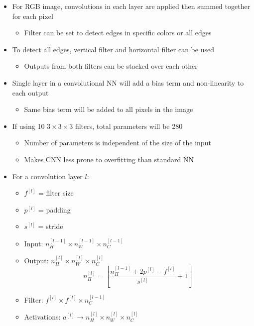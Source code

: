 \documentclass[12pt, letterpaper]{article}
\begin{document}
\begin{itemize}
\begin{figure}[ht]
        \end{figure}
        \item For RGB image, convolutions in each layer are applied then summed together for each pixel
        \begin{itemize}
            \item Filter can be set to detect edges in specific colors or all edges
        \end{itemize}
        \item To detect all edges, vertical filter and horizontal filter can be used
        \begin{itemize}
            \item Outputs from both filters can be stacked over each other
        \end{itemize}
        \item Single layer in a convolutional NN will add a bias term and non-linearity to each output
        \begin{itemize}
            \item Same bias term will be added to all pixels in the image
        \end{itemize}
        \item If using 10 $3\times 3\times 3$ filters, total parameters will be 280
        \begin{itemize}
            \item Number of parameters is independent of the size of the input
            \item Makes CNN less prone to overfitting than standard NN
        \end{itemize} 
        \item For a convolution layer $l$:
        \begin{itemize}
            \item $f^{[l]}$ = filter size
            \item $p^{[l]}$ = padding
            \item $s^{[l]}$ = stride
            \item Input: $n_H^{[l-1]} \times n_W^{[l-1]} \times n_C^{[l-1]}$
            \item Output: $n_H^{[l]} \times n_W^{[l]} \times n_C^{[l]}$
            $$n_H^{[l]}=\left\lfloor\frac{n_H^{[l-1]}+2p^{[l]}-f^{[l]}}{s^{[l]}}+1\right\rfloor$$
            \item Filter: $f^{[l]} \times f^{[l]} \times n_C^{[l-1]}$
            \item Activations:  $a^{[l]} \rightarrow n_H^{[l]} \times n_W^{[l]} \times n_C^{[l]}$ 

\end{itemize}
\end{itemize}
\end{document}

